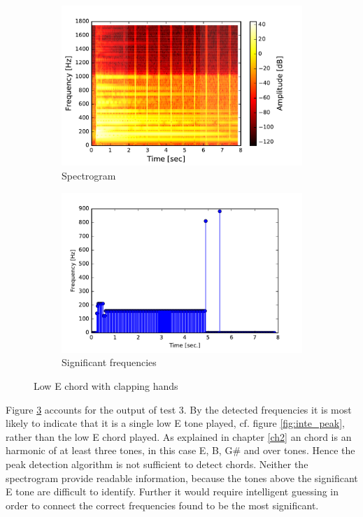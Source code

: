 \begin{figure}[H]
\centering
\begin{subfigure}{0.49\textwidth}
\centering
\includegraphics[width=\textwidth]{figures/validation/systemtest/final_spec2.pdf}
\caption{Spectrogram}
\label{fig:final_spec2}
\end{subfigure}
\begin{subfigure}{0.49\textwidth}
\centering
\includegraphics[width=\textwidth]{figures/validation/systemtest/final_peak2.pdf}
\caption{Significant frequencies}
\label{fig:final_peak2}
\end{subfigure}
\caption{Low E chord with clapping hands}
\label{fig:final_2}
\end{figure}  

Figure \ref{fig:final_2} accounts for the output of test 3. By the detected frequencies it is most likely to indicate that it is a single low E tone played, cf. figure \ref{fig:inte_peak}, rather than the low E chord played. As explained in chapter \ref{ch2} an chord is an harmonic of at least three tones, in this case E, B, G\# and over tones. Hence the peak detection algorithm is not sufficient to detect chords. Neither the spectrogram provide readable information, because the tones above the significant E tone are difficult to identify. Further it would require intelligent guessing in order to connect the correct frequencies found to be the most significant.  


